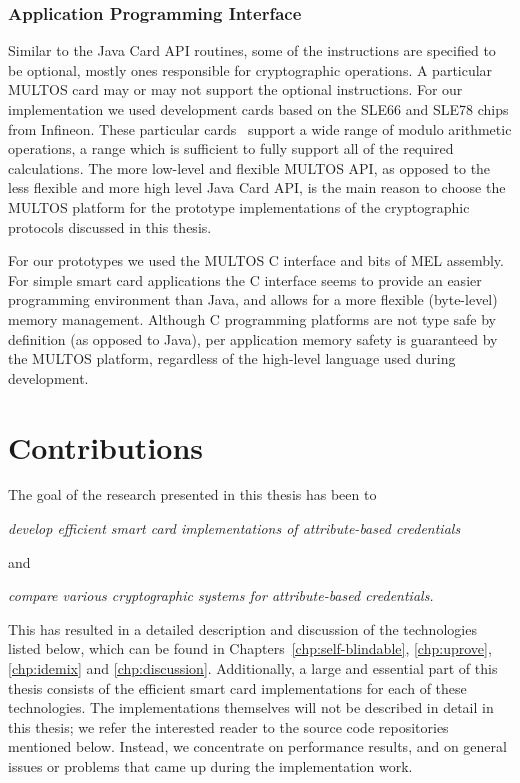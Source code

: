 \subsubsection{Application Programming Interface}

Similar to the Java Card API routines, some of the
instructions are specified to be optional, mostly ones responsible for
cryptographic operations. A particular MULTOS card may or may not support the
optional instructions. For our implementation we used development cards based on
the SLE66 and SLE78 chips from Infineon. These particular
cards~\cite{MIR2012} support a wide range of modulo arithmetic
operations, a range which is sufficient to fully support all of the required
calculations. The more low-level and flexible MULTOS API, as
opposed to the less flexible and more high level Java Card API, is the main 
reason to choose the MULTOS platform for the prototype implementations of the
cryptographic protocols discussed in this thesis.

For our prototypes we used the MULTOS C interface and bits of MEL assembly. For
simple smart card applications the C interface seems to provide an easier 
programming environment than Java, and allows for a more flexible (byte-level) 
memory management. Although C programming platforms are not type safe by 
definition (as opposed to Java), per application memory safety is guaranteed by
the MULTOS platform, regardless of the high-level language used during 
development.


\section{Contributions}

The goal of the research presented in this thesis has been to
\begin{center}\it
  develop efficient smart card implementations of attribute-based credentials
\end{center}
and
\begin{center}\it
  compare various cryptographic systems for attribute-based credentials.
\end{center}
This has resulted in a detailed description and discussion of the technologies
listed below, which can be found in Chapters~\ref{chp:self-blindable},
\ref{chp:uprove}, \ref{chp:idemix} and \ref{chp:discussion}. Additionally, a
large and essential part of this thesis consists of the efficient smart card
implementations for each of these technologies. The implementations themselves
will not be described in detail in this thesis; we refer the interested reader
to the source code repositories mentioned below. Instead, we concentrate on
performance results, and on general issues or problems that came up during the
implementation work.


